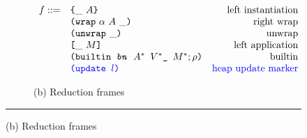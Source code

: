 \begin{figure}

\begin{subfigure}[c]{\linewidth}     %
{
\small
\caption*{(b) Reduction frames}
\[
    \begin{array}{rlr}
      f :: = & \texttt{\{}\_ ~ A\texttt{\}}                     & \textrm{left instantiation}\\
             & \texttt{(} \texttt{wrap} ~ \alpha ~ A ~ \_ \texttt{)}            & \textrm{right wrap}\\
             & \texttt{(} \texttt{unwrap} ~ \_ \texttt{)}{}                        & \textrm{unwrap}\\
             & \texttt{[} \_ ~ M \texttt{]}                      & \textrm{left application}\\
             & \texttt{(builtin \textit{bn} $A^*\ V^*\_\ M^*; \rho$)}        & \textrm{builtin}\\
             & \textcolor{blue}{\texttt{(update\ $l$)}}                   & \textrm{\textcolor{blue}{heap update marker}}\\
    \end{array}
\]
}
\end{subfigure}

\vspace{3mm}
\hrule
\vspace{3mm}


\end{figure}
